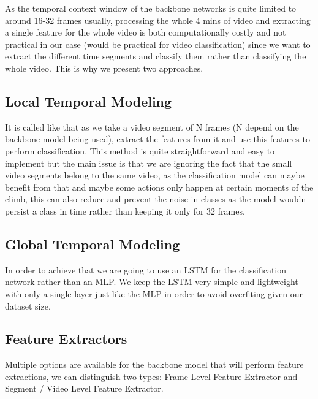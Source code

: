 As the temporal context window of the backbone networks is quite limited to around 16-32 frames usually, processing the whole 4 mins of video and extracting a single feature for the whole video is both computationally costly and not practical in our case (would be practical for video classification) since we want to extract the different time segments and classify them rather than classifying the whole video.
This is why we present two approaches.

\subsection{Local Temporal Modeling}
It is called like that as we take a video segment of N frames (N depend on the backbone model being used), extract the features from it and use this features to perform classification.
This method is quite straightforward and easy to implement but the main issue is that we are ignoring the fact that the small video segments belong to the same video, as the classification model 
can maybe benefit from that and maybe some actions only happen at certain moments of the climb, this can also reduce and prevent the noise in classes as the model wouldn persist a class in time rather than keeping it only for 32 frames.


\subsection{Global Temporal Modeling}


In order to achieve that we are going to use an LSTM for the classification network rather than an MLP. We keep the LSTM very simple and lightweight with only a single layer just like the MLP in order to avoid overfiting given our dataset size.


\subsection*{Feature Extractors}
Multiple options are available for the backbone model that will perform feature extractions, we can distinguish two types: Frame Level Feature Extractor and Segment / Video Level Feature Extractor.

